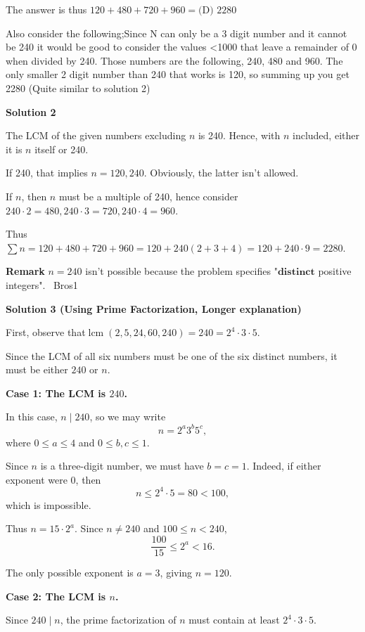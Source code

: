 \begin{enumerate}
 The answer is thus $120+480+720+960=\boxed{\text{(D) }2280}$

 
Also consider the following;Since N can only be a 3 digit number and it cannot be 240 it would be good to consider the values <1000 that leave a remainder of 0 when divided by 240. Those numbers are the following, 240, 480 and 960. The only smaller 2 digit number than 240 that works is 120, so summing up you get 2280 (Quite similar to solution 2)

 



\textbf{Solution 2}

The LCM of the given numbers excluding $n$ is 240. Hence, with $n$ included, either it is $n$ itself or 240.

 If 240, that implies $n = 120,240$. Obviously, the latter isn't allowed.

 If $n$, then $n$ must be a multiple of 240, hence consider $240 \cdot 2 = 480, 240 \cdot 3 = 720, 240 \cdot 4 = 960$.

 Thus $\sum n = 120+480+720 + 960 = 120 + 240(2+3+4 )= 120 + 240 \cdot 9 = \boxed{2280}$.

 \textbf{Remark} $n=240$ isn't possible because the problem specifies "$\textbf{distinct}$ positive integers". ~Bros1

 



\textbf{Solution 3 (Using Prime Factorization, Longer explanation)}

First, observe that$\operatorname{lcm}(2,5,24,60,240)=240=2^4\cdot3\cdot5$.

 Since the LCM of all six numbers must be one of the six distinct numbers, it must be either $240$ or $n$.

 \textbf{Case 1: The LCM is $240$.}

 In this case, $n\mid240$, so we may write
 \[n=2^a3^b5^c,\]where $0\le a\le4$ and $0\le b,c\le1$.

 Since $n$ is a three-digit number, we must have $b=c=1$. Indeed, if either exponent were $0$, then
 \[n\le 2^4\cdot5=80<100,\]which is impossible.

 Thus $n=15\cdot2^a$. Since $n\ne240$ and $100\le n<240$,
 \[\frac{100}{15}\le2^a<16.\]

 The only possible exponent is $a=3$, giving $\boxed{n=120}$.

 \textbf{Case 2: The LCM is $n$.}

 Since $240\mid n$, the prime factorization of $n$ must contain at least $2^4\cdot3\cdot5$.


\end{enumerate}
